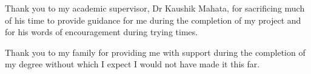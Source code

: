 {}
\newpage
\begin{acknowledgements}

Thank you to my academic supervisor, Dr Kaushik Mahata, for sacrificing much of his time to provide guidance for me during the completion of my project and for his words of encouragement during trying times.

Thank you to my family for providing me with support during the completion of my degree without which I expect I would not have made it this far.

\end{acknowledgements}